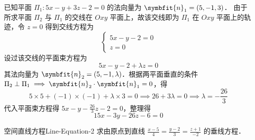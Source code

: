 \begin{solution}
    已知平面 $\Pi_1: 5x - y + 3z - 2 = 0$ 的法向量为 $\symbfit{n}_1 = (5, -1, 3)$．
    由于所求平面 $\Pi_2$ 与 $\Pi_1$ 的交线在 $Oxy$ 平面上，故该交线即为 $\Pi_1$ 在 $Oxy$ 平面上的轨迹，令 $z = 0$ 得到交线方程为
    \begin{equation}
        \begin{cases}
            5x - y - 2 = 0 \\
            z = 0
        \end{cases}
    \end{equation}
    设过该交线的平面束方程为
    \begin{equation}
        5x - y - 2 + \lambda z = 0
    \end{equation}
    其法向量为 $\symbfit{n}_2 = (5, -1, \lambda)$．根据两平面垂直的条件 $\Pi_2 \perp \Pi_1 \implies \symbfit{n}_2 \cdot \symbfit{n}_1 = 0$，得
    \begin{equation}
        5 \times 5 + (-1) \times (-1) + \lambda \times 3 = 0 \implies 26 + 3\lambda = 0 \implies \lambda = -\frac{26}{3}
    \end{equation}
    代入平面束方程得 $5x - y - \frac{26}{3}z - 2 = 0$，整理得
    \begin{equation}
        \boxed{15x - 3y - 26z - 6 = 0}
    \end{equation}
\end{solution}

\begin{problem}{空间直线方程}{Line-Equation-2}
    求由原点到直线 $\frac{x-5}{4} = \frac{y-2}{3} = \frac{z+1}{-2}$ 的垂线方程．
\end{problem}

